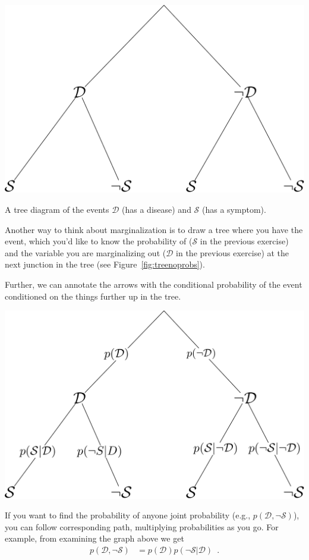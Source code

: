 \documentclass[assignment01_Solutions]{subfiles}
\begin{document}
\begin{marginfigure}
\includegraphics[width=\linewidth]{figures/treenoprobs}
\caption{A tree diagram of the events $\mathcal{D}$ (has a disease) and $\mathcal{S}$ (has a symptom).\label{fig:treenoprobs}}
\end{marginfigure}
Another way to think about marginalization is to draw a tree where you have the event, which you'd like to know the probability of ($\mathcal{S}$ in the previous exercise) and the variable you are marginalizing out ($\mathcal{D}$ in the previous exercise) at the next junction in the tree (see Figure~\ref{fig:treenoprobs}).



Further, we can annotate the arrows with the conditional probability of the event conditioned on the things further up in the tree.

\begin{center}
\includegraphics[width=0.6\linewidth]{figures/treeprobs}
\end{center}

If you want to find the probability of anyone joint probability (e.g., $p(\mathcal{D}, \neg \mathcal{S})$), you can follow corresponding path, multiplying probabilities as you go.  For example, from examining the graph above we get
\begin{align}
p(\mathcal{D}, \neg \mathcal{S}) &= p(\mathcal{D}) p(\neg \mathcal{S}|\mathcal{D}) \enspace .
\end{align}
\end{document}

